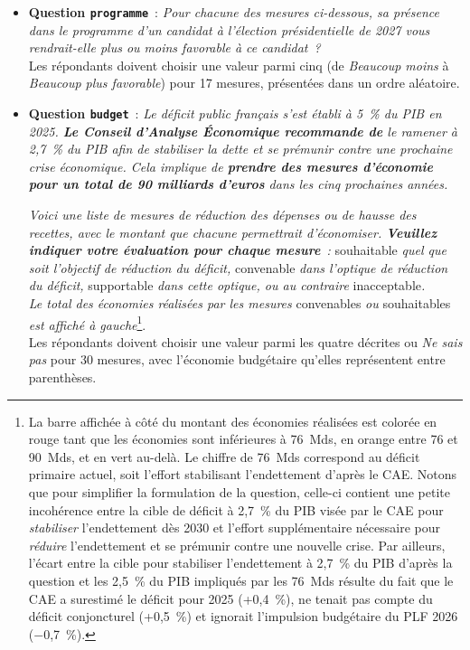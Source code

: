 \documentclass[12pt,french]{article}
\begin{document}
\begin{itemize}
  \item \textbf{Question \texttt{programme}}~: \textit{Pour chacune des mesures ci-dessous, sa présence dans le programme d'un candidat à l'élection présidentielle de 2027 vous rendrait-elle plus ou moins favorable à ce candidat~?} \\ Les répondants doivent choisir une valeur parmi cinq (de \textit{Beaucoup moins} à \textit{Beaucoup plus favorable}) pour 17 mesures, présentées dans un ordre aléatoire. 
  \item \textbf{Question \texttt{budget}}~: \textit{Le déficit public français s'est établi à 5~\% du PIB en 2025. \textbf{Le Conseil d'Analyse Économique recommande de} le ramener à 2,7~\% du PIB afin de stabiliser la dette et se prémunir contre une prochaine crise économique. Cela implique de \textbf{prendre des mesures d'économie pour un total de 90 milliards d'euros} dans les cinq prochaines années.}

\textit{Voici une liste de mesures de réduction des dépenses ou de hausse des recettes, avec le montant que chacune permettrait d'économiser.
\textbf{Veuillez indiquer votre évaluation pour chaque mesure}~: }souhaitable\textit{ quel que soit l'objectif de réduction du déficit, }convenable\textit{ dans l'optique de réduction du déficit, }supportable\textit{ dans cette optique, ou au contraire }inacceptable\textit{.\\
Le total des économies réalisées par les mesures }convenables\textit{ ou }souhaitables\textit{ est affiché à gauche}\footnote{La barre affichée à côté du montant des économies réalisées est colorée en rouge tant que les économies sont inférieures à 76~Mds, en orange entre 76 et 90~Mds, et en vert au-delà. Le chiffre de 76~Mds correspond au déficit primaire actuel, soit l'effort stabilisant l'endettement d'après le CAE. %
Notons que pour simplifier la formulation de la question, celle-ci contient une petite incohérence entre la cible de déficit à 2,7~\% du PIB visée par le CAE pour \textit{stabiliser} l'endettement dès 2030 et l'effort supplémentaire nécessaire %
pour \textit{réduire} l'endettement et se prémunir contre une nouvelle crise. %
Par ailleurs, l'écart entre la cible pour stabiliser l'endettement à 2,7~\% du PIB d'après la question et les 2,5~\% du PIB impliqués par les 76~Mds résulte du fait que le CAE a surestimé le déficit pour 2025 (+0,4~\%), ne tenait pas compte du déficit conjoncturel (+0,5~\%) et ignorait l'impulsion budgétaire du PLF 2026 ($-$0,7~\%).
 }. \\ Les répondants doivent choisir une valeur parmi les quatre décrites ou \textit{Ne sais pas} pour 30 mesures, avec l'économie budgétaire qu'elles représentent entre parenthèses.
\end{itemize}
\end{document}
